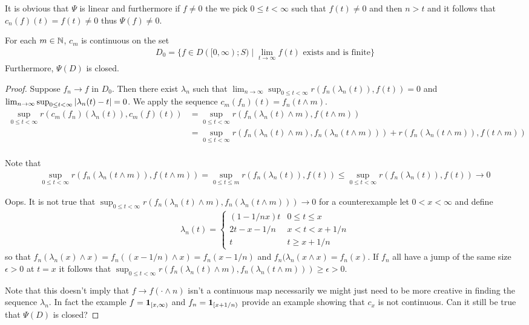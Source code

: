 It is obvious that $\Psi$ is linear and furthermore if $f \neq 0$ the we pick $0 \leq t < \infty$ such that $f(t) \neq 0$ and then $n > t$ and it follows that $c_n(f)(t) = f(t) \neq 0$ thus $\Psi(f) \neq 0$.  

\begin{lem}For each $m \in \mathbb{N}$, $c_m$ is continuous on the set 
\begin{align*}
D_0 = \lbrace f \in D([0,\infty);S) \mid \lim_{t \to \infty} f(t) \text{ exists and is finite} \rbrace
\end{align*}  
Furthermore, $\Psi(D)$ is closed.
\end{lem}
\begin{proof}
Suppose $f_n \to f$ in $D_0$.  Then there exist $\lambda_n$ such that $\lim_{n \to \infty} \sup_{0 \leq t < \infty} r(f_n(\lambda_n(t)) , f(t)) = 0$ and $\lim_{n \to \infty} \sup_{0 \leq t < \infty} \left \vert \lambda_n(t) - t \right \vert = 0$.  We apply the sequence $c_m(f_n)(t) = f_n(t \wedge m)$.  
\begin{align*}
\sup_{0 \leq t < \infty} r(c_m(f_n)(\lambda_n(t)) , c_m(f)(t)) 
&=\sup_{0 \leq t < \infty} r(f_n(\lambda_n(t) \wedge m) , f(t \wedge m)) \\
&=\sup_{0 \leq t < \infty} r(f_n(\lambda_n(t) \wedge m) , f_n(\lambda_n(t \wedge m)))+ r( f_n(\lambda_n(t \wedge m)) , f(t \wedge m)) \\
\end{align*}

Note that 
\begin{align*}
\sup_{0 \leq t < \infty} r( f_n(\lambda_n(t \wedge m)) , f(t \wedge m)) = \sup_{0 \leq t \leq m} r( f_n(\lambda_n(t)) , f(t)) 
\leq \sup_{0 \leq t < \infty} r( f_n(\lambda_n(t)) , f(t)) \to 0
\end{align*}

Oops.  It is not true that $\sup_{0 \leq t < \infty} r(f_n(\lambda_n(t) \wedge m) , f_n(\lambda_n(t \wedge m))) \to 0$ for a counterexample
let $0 < x < \infty$ and define 
\begin{align*}
\lambda_n(t) = \begin{cases}
(1-1/nx) t & 0 \leq t \leq x \\
2t - x - 1/n & x < t < x+1/n \\
t & t \geq x+1/n
\end{cases}
\end{align*}
so that $f_n(\lambda_n(x) \wedge x) = f_n((x - 1/n) \wedge x) = f_n(x-1/n)$ and $f_n(\lambda_n(x \wedge x) = f_n(x)$.  If $f_n$ all have a jump of the same size $\epsilon>0$ at 
$t=x$ it follows that $\sup_{0 \leq t < \infty} r(f_n(\lambda_n(t) \wedge m) , f_n(\lambda_n(t \wedge m))) \geq \epsilon > 0$.

Note that this doesn't imply that $f \to f(\cdot \wedge n)$ isn't a continuous map necessarily we might just need to be more creative in finding the sequence $\lambda_n$.
In fact the example $f = \textbf{1}_{[x, \infty)}$ and $f_n = \textbf{1}_{[x+1/n)}$ provide an example showing that $c_x$ is not continuous.  Can it still be true that $\Psi(D)$ is closed?
\end{proof}

